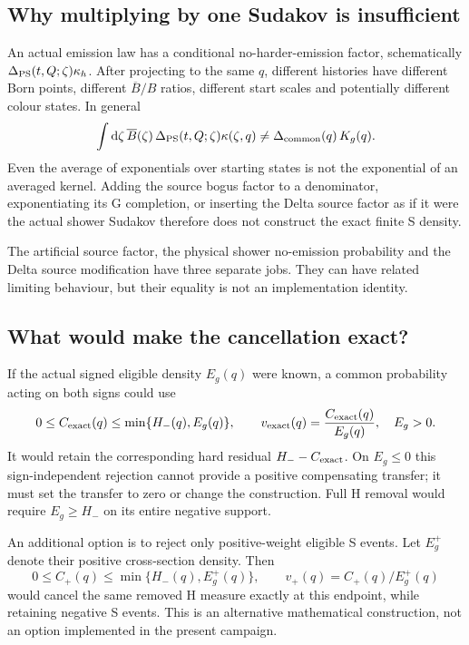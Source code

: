 \subsection{Why multiplying by one Sudakov is insufficient}
An actual emission law has a conditional no-harder-emission factor,
schematically $\Delta_{\rm PS}(t,Q;\zeta)\kappa_h$. After projecting
to the same $q$, different histories have different Born points,
different $\overline B/B$ ratios, different start scales and potentially
different colour states. In general
\begin{equation}
 \int\mathrm d\zeta\,\overline B(\zeta)\,
 \Delta_{\rm PS}(t,Q;\zeta)\kappa(\zeta,q)
 \ne \Delta_{\rm common}(q)\,K_g(q).
 \label{eq:no-common-sudakov}
\end{equation}
Even the average of exponentials over starting states is not the
exponential of an averaged kernel. Adding the source bogus factor to a
denominator, exponentiating its G completion, or inserting the Delta
source factor as if it were the actual shower Sudakov therefore does
not construct the exact finite S density.

The artificial source factor, the physical shower no-emission
probability and the Delta source modification have three separate jobs.
They can have related limiting behaviour, but their equality is not an
implementation identity.

\subsection{What would make the cancellation exact?}
\label{sec:exact-cancellation}
If the actual signed eligible density $E_g(q)$ were known, a common
probability acting on both signs could use
\begin{equation}
 0\leq C_{\rm exact}(q)\leq\min\{H_-(q),E_g(q)\},\qquad
 v_{\rm exact}(q)=\frac{C_{\rm exact}(q)}{E_g(q)},\quad E_g>0.
 \label{eq:exact-veto}
\end{equation}
It would retain the corresponding hard residual
$H_--C_{\rm exact}$. On $E_g\leq0$ this sign-independent rejection
cannot provide a positive compensating transfer; it must set the
transfer to zero or change the construction. Full H removal would require
$E_g\geq H_-$ on its entire negative support.

An additional option is to reject only positive-weight eligible S
events. Let $E_g^+$ denote their positive cross-section density. Then
\begin{equation}
 0\leq C_+(q)\leq\min\{H_-(q),E_g^+(q)\},\qquad
 v_+(q)=C_+(q)/E_g^+(q)
 \label{eq:positive-s-veto}
\end{equation}
would cancel the same removed H measure exactly at this endpoint, while
retaining negative S events. This is an alternative mathematical
construction, not an option implemented in the present campaign.

